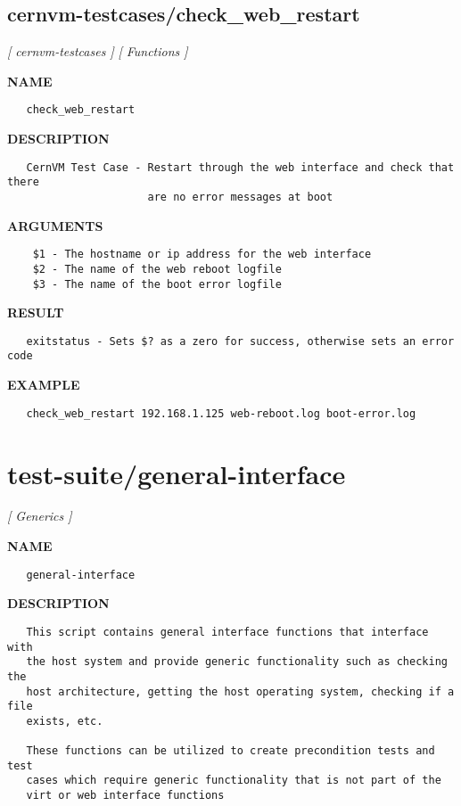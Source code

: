 \subsection{cernvm-testcases/check\_web\_restart}
\textsl{[ cernvm-testcases ]}
\textsl{[ Functions ]}

\label{ch:robo19}
\label{ch:cernvm_testcases_check_web_restart}
\textbf{NAME}
\begin{verbatim}
   check_web_restart
\end{verbatim}
\textbf{DESCRIPTION}
\begin{verbatim}
   CernVM Test Case - Restart through the web interface and check that there
                      are no error messages at boot
\end{verbatim}
\textbf{ARGUMENTS}
\begin{verbatim}
    $1 - The hostname or ip address for the web interface
    $2 - The name of the web reboot logfile
    $3 - The name of the boot error logfile
\end{verbatim}
\textbf{RESULT}
\begin{verbatim}
   exitstatus - Sets $? as a zero for success, otherwise sets an error code
\end{verbatim}
\textbf{EXAMPLE}
\begin{verbatim}
   check_web_restart 192.168.1.125 web-reboot.log boot-error.log
\end{verbatim}
\newpage
\section{test-suite/general-interface}
\textsl{[ Generics ]}

\label{ch:robo34}
\label{ch:test_suite_general_interface}
\textbf{NAME}
\begin{verbatim}
   general-interface
\end{verbatim}
\textbf{DESCRIPTION}
\begin{verbatim}
   This script contains general interface functions that interface with 
   the host system and provide generic functionality such as checking the
   host architecture, getting the host operating system, checking if a file
   exists, etc.

   These functions can be utilized to create precondition tests and test 
   cases which require generic functionality that is not part of the
   virt or web interface functions
\end{verbatim}
\newpage

